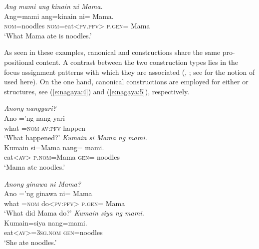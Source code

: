 \documentclass[output=paper]{langsci/langscibook}
\begin{document}
\begin{exe}
	\ex\label{e:nagaya:3}\textit{Ang mami ang kinain ni Mama.}\\
	\gll {\USOParen}Ang={\USCParen}mami    ang={\ob}k{\USSmaller}in{\USGreater}ain  ni=    Mama{\cb}.\\
	\textsc{nom}=noodles  \textsc{nom}=eat<\textsc{pv.pfv}>  \textsc{p.gen}=  Mama\\
	\glt ‘What Mama ate is noodles.’
\end{exe}

\noindent
As seen in these examples, canonical and  constructions share the same pro-\linebreak positional content. A contrast between the two construction types lies in the focus assignment patterns with which they are associated (\citealt{Kaufman2005}, \citealt{Nagaya2007}; see \citealt{Lambrecht1994} for the notion of  used here). On the one hand, canonical constructions are employed for either  or  structures, see (\ref{e:nagaya:4}) and (\ref{e:nagaya:5}), respectively.

\begin{exe}
	\ex\label{e:nagaya:4}
	\begin{xlist}
		 \textit{Anong nangyari?}\\
		\gll Ano  =’ng  nang-yari{\USQMark}\\
		what  \textsc{=nom}  \textsc{av:pfv}-happen\\
		\glt ‘What happened?’
		 \textit{Kumain si Mama ng mami.}\\
		\gll K{\USSmaller}um{\USGreater}ain  si=Mama    nang=  mami.\\
		eat<\textsc{av}>  \textsc{p.nom}=Mama  \textsc{gen}=  noodles\\
		\glt ‘Mama ate noodles.’
	\end{xlist}
\end{exe}

\begin{exe}
	\ex\label{e:nagaya:5}
	\begin{xlist}
		 \textit{Anong ginawa ni Mama?}\\
		\gll Ano  =’ng  g{\USSmaller}in{\USGreater}awa  ni=    Mama{\USQMark}\\
		what  =\textsc{nom}  do<\textsc{pv:pfv}>  \textsc{p.gen}=  Mama\\
		\glt ‘What did Mama do?’
		 \label{e:nagaya:5a} \textit{Kumain siya ng mami.}\\
		\gll K{\USSmaller}um{\USGreater}ain=siya  nang=mami.\\
		eat<\textsc{av}>=\textsc{3sg.nom}  \textsc{gen}=noodles\\
		\glt ‘She ate noodles.’
	\end{xlist}
\end{exe}
\end{document}
